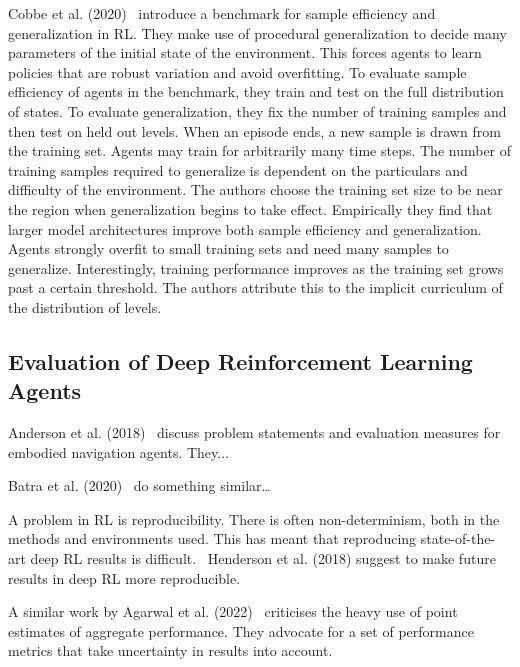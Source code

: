 Cobbe et al. (2020)~\cite{cobbe_procgen_2020} introduce a benchmark for sample efficiency and generalization in RL.
They make use of procedural generalization to decide many parameters of the initial state of the environment.
This forces agents to learn policies that are robust variation and avoid overfitting.
To evaluate sample efficiency of agents in the benchmark, they train and test on the full distribution of states.
To evaluate generalization, they fix the number of training samples and then test on held out levels.
When an episode ends, a new sample is drawn from the training set.
Agents may train for arbitrarily many time steps.
The number of training samples required to generalize is dependent on the particulars and difficulty of the environment.
The authors choose the training set size to be near the region when generalization begins to take effect.
Empirically they find that larger model architectures improve both sample efficiency and generalization.
Agents strongly overfit to small training sets and need many samples to generalize.
Interestingly, training performance improves as the training set grows past a certain threshold.
The authors attribute this to the implicit curriculum of the distribution of levels.

\subsection{Evaluation of Deep Reinforcement Learning Agents}

Anderson et al. (2018)~\cite{anderson_evaluation_2018} discuss problem statements and evaluation measures for embodied navigation agents.
They...

Batra et al. (2020)~\cite{batra_evaluation_2020} do something similar\dots

A problem in RL is reproducibility.
There is often non-determinism, both in the methods and environments used.
This has meant that reproducing state-of-the-art deep RL results is difficult.~\cite{henderson_matters_2018}
Henderson et al. (2018) suggest to make future results in deep RL more reproducible.

A similar work by Agarwal et al. (2022)~\cite{agarwal_rlliable_2022} criticises the heavy use of point estimates of aggregate performance.
They advocate for a set of performance metrics that take uncertainty in results into account. 